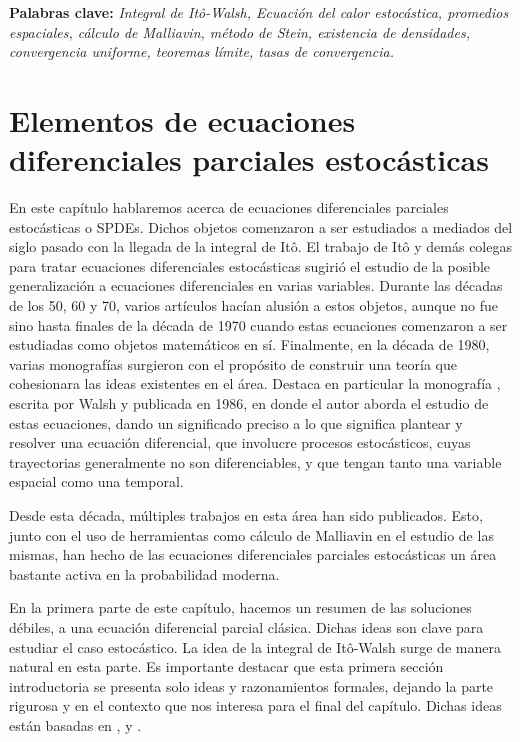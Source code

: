 \documentclass[letterpaper,twoside,12pt]{book}
\newcommand{\1}{\mathds{1}}
\theoremstyle{definition}
\theoremstyle{definition}
\theoremstyle{remark}
\theoremstyle{definition}
\theoremstyle{definition}
\theoremstyle{definition}
\theoremstyle{definition}
\theoremstyle{definition}
\begin{document}
\textbf{Palabras clave:} \textit{Integral de Itô-Walsh, Ecuación del calor estocástica, promedios espaciales, cálculo de Malliavin, método de Stein, existencia de densidades, convergencia uniforme, teoremas límite, tasas de convergencia.}





\mainmatter

\chapter{Elementos de ecuaciones diferenciales parciales estocásticas}

En este capítulo hablaremos acerca de ecuaciones diferenciales parciales estocásticas o SPDEs.
Dichos objetos comenzaron a ser estudiados a mediados del siglo pasado con la llegada de la integral de Itô.
El trabajo de Itô y demás colegas para tratar ecuaciones diferenciales estocásticas sugirió el estudio de la posible generalización a ecuaciones diferenciales en varias variables.
Durante las décadas de los 50, 60 y 70, varios artículos hacían alusión a estos objetos, aunque no fue sino hasta finales de la década de 1970 cuando estas ecuaciones comenzaron a ser estudiadas como objetos matemáticos en sí.
Finalmente, en la década de 1980, varias monografías surgieron con el propósito de construir una teoría que cohesionara las ideas existentes en el área. Destaca en particular la monografía \cite{Walsh_J.B_Introduction_to_SPDEs}, escrita por Walsh  y publicada en 1986, en donde el autor aborda el estudio de estas ecuaciones, dando un significado preciso a lo que significa plantear y resolver una ecuación diferencial, que involucre procesos estocásticos, cuyas trayectorias generalmente no son diferenciables, y que tengan tanto una variable espacial como una temporal.

Desde esta década, múltiples trabajos en esta área han sido publicados. Esto, junto con el uso de herramientas como cálculo de Malliavin en el estudio de las mismas, han hecho de las ecuaciones diferenciales parciales estocásticas un área bastante activa en la probabilidad moderna.

En la primera parte de este capítulo, hacemos un resumen de las soluciones débiles, a una ecuación diferencial parcial clásica. Dichas ideas son clave para estudiar el caso estocástico. La idea de la integral de Itô-Walsh surge de manera natural en esta parte. Es importante destacar que esta primera sección introductoria se presenta solo ideas y razonamientos formales, dejando la parte rigurosa y en el contexto que nos interesa para el final del capítulo. Dichas ideas están basadas en \cite{evans2010partial}, \cite{BonderEcuaciones} y \cite{Khoshnevisan2009}.
\end{document}
